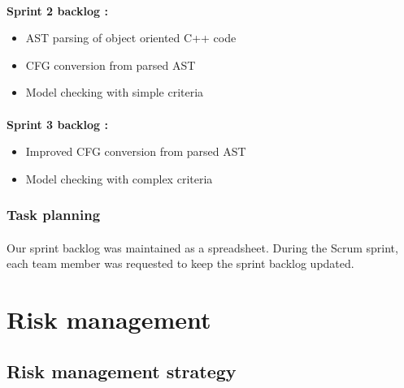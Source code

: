 \documentclass{report}
\begin{document}
\paragraph{}
\hspace{4mm}\textbf{Sprint 2 backlog :}

\vspace{1.5mm}
\begin{itemize}
\item AST parsing of object oriented C++ code\vspace{1mm}
\item CFG conversion from parsed AST\vspace{1mm}
\item Model checking with simple criteria\vspace{1mm}
\end{itemize}

\paragraph{}
\hspace{4mm}\textbf{Sprint 3 backlog :}

\vspace{1.5mm}
\begin{itemize}
\item Improved CFG conversion from parsed AST\vspace{1mm}
\item Model checking with complex criteria\vspace{1mm}
\end{itemize}

\subsubsection{Task planning}

\paragraph{}
\hspace{4mm}Our sprint backlog was maintained as a spreadsheet. 
During the Scrum sprint, each team member was requested to 
keep the sprint backlog updated.

\section{Risk management}

\subsection{Risk management strategy}
\end{document}
